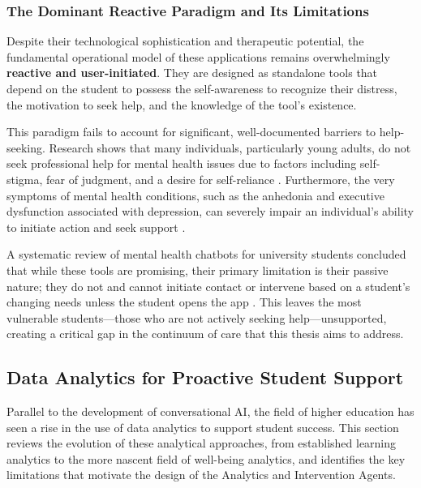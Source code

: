 \subsubsection{The Dominant Reactive Paradigm and Its Limitations}
Despite their technological sophistication and therapeutic potential, the fundamental operational model of these applications remains overwhelmingly \textbf{reactive and user-initiated}. They are designed as standalone tools that depend on the student to possess the self-awareness to recognize their distress, the motivation to seek help, and the knowledge of the tool's existence.

This paradigm fails to account for significant, well-documented barriers to help-seeking. Research shows that many individuals, particularly young adults, do not seek professional help for mental health issues due to factors including self-stigma, fear of judgment, and a desire for self-reliance \cite{corrigan2009stigmahelpseeking,patel2022helpseekingcollege}. Furthermore, the very symptoms of mental health conditions, such as the anhedonia and executive dysfunction associated with depression, can severely impair an individual's ability to initiate action and seek support \cite{liu2023distresshelpseeking}.

A systematic review of mental health chatbots for university students concluded that while these tools are promising, their primary limitation is their passive nature; they do not and cannot initiate contact or intervene based on a student's changing needs unless the student opens the app \cite{adhikari2023chatbotsreview}. This leaves the most vulnerable students—those who are not actively seeking help—unsupported, creating a critical gap in the continuum of care that this thesis aims to address.


\subsection{Data Analytics for Proactive Student Support}

Parallel to the development of conversational AI, the field of higher education has seen a rise in the use of data analytics to support student success. This section reviews the evolution of these analytical approaches, from established learning analytics to the more nascent field of well-being analytics, and identifies the key limitations that motivate the design of the Analytics and Intervention Agents.

